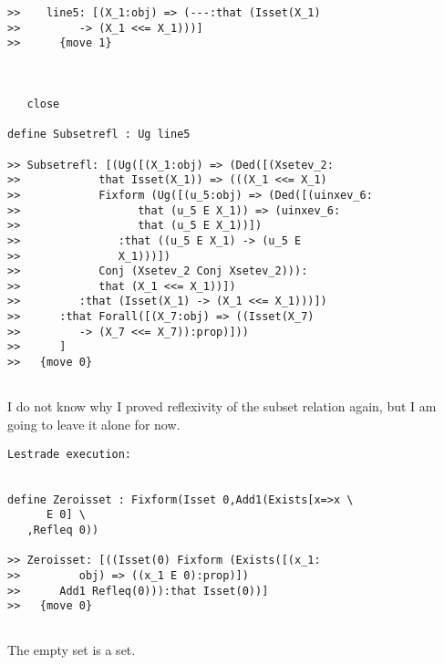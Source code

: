 \documentclass[12pt]{article}
\begin{document}
\begin{verbatim}
>>    line5: [(X_1:obj) => (---:that (Isset(X_1)
>>         -> (X_1 <<= X_1)))]
>>      {move 1}



   close

define Subsetrefl : Ug line5

>> Subsetrefl: [(Ug([(X_1:obj) => (Ded([(Xsetev_2:
>>            that Isset(X_1)) => (((X_1 <<= X_1)
>>            Fixform (Ug([(u_5:obj) => (Ded([(uinxev_6:
>>                  that (u_5 E X_1)) => (uinxev_6:
>>                  that (u_5 E X_1))])
>>               :that ((u_5 E X_1) -> (u_5 E
>>               X_1)))])
>>            Conj (Xsetev_2 Conj Xsetev_2))):
>>            that (X_1 <<= X_1))])
>>         :that (Isset(X_1) -> (X_1 <<= X_1)))])
>>      :that Forall([(X_7:obj) => ((Isset(X_7)
>>         -> (X_7 <<= X_7)):prop)]))
>>      ]
>>   {move 0}


\end{verbatim}

I do not know why I proved reflexivity of the subset relation again, but I am going to leave it alone for now.

\begin{verbatim}Lestrade execution:


define Zeroisset : Fixform(Isset 0,Add1(Exists[x=>x \
      E 0] \
   ,Refleq 0))

>> Zeroisset: [((Isset(0) Fixform (Exists([(x_1:
>>         obj) => ((x_1 E 0):prop)])
>>      Add1 Refleq(0))):that Isset(0))]
>>   {move 0}


\end{verbatim}

The empty set is a set.
\end{document}
